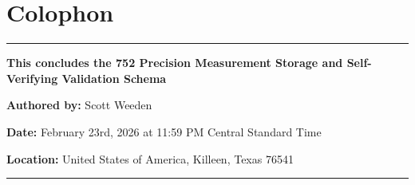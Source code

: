 \documentclass[12pt]{article}
\begin{document}
\section*{Colophon}

\begin{center}
\rule{0.8\textwidth}{0.5pt}

\vspace{1em}

\textbf{\large This concludes the 752 Precision Measurement Storage and Self-Verifying Validation Schema}

\vspace{1.5em}

\textbf{Authored by:} Scott Weeden

\vspace{0.5em}

\textbf{Date:} February 23rd, 2026 at 11:59 PM Central Standard Time

\vspace{0.5em}

\textbf{Location:} United States of America, Killeen, Texas 76541

\vspace{1em}

\rule{0.8\textwidth}{0.5pt}
\end{center}
\end{document}
